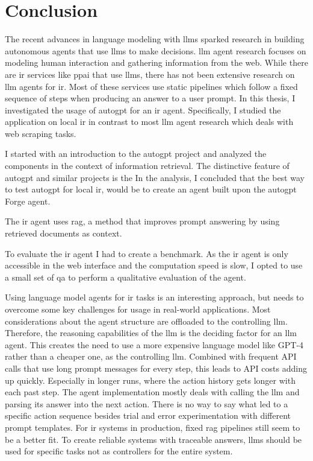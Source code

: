 \documentclass[../main.tex]{subfiles}
\begin{document}
\chapter{Conclusion}
\label{ch:conclusion}
\glsresetall
The recent advances in language modeling with \glspl{llm} sparked research
in building autonomous agents that use \glspl{llm} to make decisions.
\Gls{llm} agent research focuses on modeling human interaction and gathering
information from the web.
While there are \gls{ir} services like \gls{ppai} that use \glspl{llm}, there has not been
extensive research on \gls{llm} agents for \gls{ir}.
Most of these services use static pipelines which follow a fixed sequence of
steps when producing an answer to a user prompt.
In this thesis, I investigated the usage of \gls{autogpt} for an \gls{ir} agent.
Specifically, I studied the application on local \gls{ir} in contrast to most \gls{llm}
agent research which deals with web scraping tasks.

I started with an introduction to the \gls{autogpt} project and analyzed
the components in the context of information retrieval.
The distinctive feature of \gls{autogpt} and similar projects is the
In the analysis, I concluded that the best way to test \gls{autogpt}
for local \gls{ir}, would be to create an agent built upon the \gls{autogpt}
Forge agent.

The \gls{ir} agent uses \gls{rag}, a method that improves prompt answering
by using retrieved documents as context.

To evaluate the \gls{ir} agent I had to create a benchmark.
As the \gls{ir} agent is only accessible in the web interface and
the computation speed is slow, I opted to use a small set of \gls{qa}
to perform a qualitative evaluation of the agent.

Using language model agents for \gls{ir} tasks is an interesting approach,
but needs to overcome some key challenges for usage in real-world applications.
Most considerations about the agent structure are offloaded to the controlling \gls{llm}.
Therefore, the reasoning capabilities of the \gls{llm} is the deciding factor
for an \gls{llm} agent.
This creates the need to use a more expensive language model like GPT-4 rather than
a cheaper one, as the controlling \gls{llm}.
Combined with frequent API calls that use long prompt messages for every step,
this leads to API costs adding up quickly.
Especially in longer runs, where the action history gets longer with each past step.
The agent implementation mostly deals with calling the \gls{llm} and parsing
its answer into the next action.
There is no way to say what led to a specific action sequence besides
trial and error experimentation with different prompt templates.
For \gls{ir} systems in production, fixed \gls{rag} pipelines still seem to
be a better fit.
To create reliable systems with traceable answers, \glspl{llm} should be used for
specific tasks not as controllers for the entire system.
\end{document}
